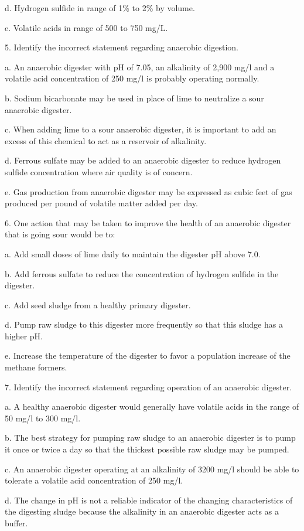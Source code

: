 \documentclass{article}
\begin{document}
d. Hydrogen sulfide in range of 1\% to 2\% by volume. 

e. Volatile acids in range of 500 to 750 mg/L. 


5. Identify the incorrect statement regarding anaerobic digestion. 

a. An anaerobic digester with pH of 7.05, an alkalinity of 2,900 mg/l and a volatile acid concentration of 250 mg/l is probably operating normally. 

b. Sodium bicarbonate may be used in place of lime to neutralize a sour anaerobic digester. 

c. When adding lime to a sour anaerobic digester, it is important to add an excess of this chemical to act as a reservoir of alkalinity. 

d. Ferrous sulfate may be added to an anaerobic digester to reduce hydrogen sulfide concentration where air quality is of concern. 

e. Gas production from anaerobic digester may be expressed as cubic feet of gas produced per pound of volatile matter added per day. 


6. One action that may be taken to improve the health of an anaerobic digester that is going sour would be to: 

a. Add small doses of lime daily to maintain the digester pH above 7.0. 

b. Add ferrous sulfate to reduce the concentration of hydrogen sulfide in the digester. 

c. Add seed sludge from a healthy primary digester. 

d. Pump raw sludge to this digester more frequently so that this sludge has a higher pH. 

e. Increase the temperature of the digester to favor a population increase of the methane formers. 


7. Identify the incorrect statement regarding operation of an anaerobic digester. 

a. A healthy anaerobic digester would generally have volatile acids in the range of 50 mg/l to 300 mg/l. 

b. The best strategy for pumping raw sludge to an anaerobic digester is to pump it once or twice a day so that the thickest possible raw sludge may be pumped. 

c. An anaerobic digester operating at an alkalinity of 3200 mg/l should be able to tolerate a volatile acid concentration of 250 mg/l. 

d. The change in pH is not a reliable indicator of the changing characteristics of the digesting sludge because the alkalinity in an anaerobic digester acts as a buffer. 
\end{document}
